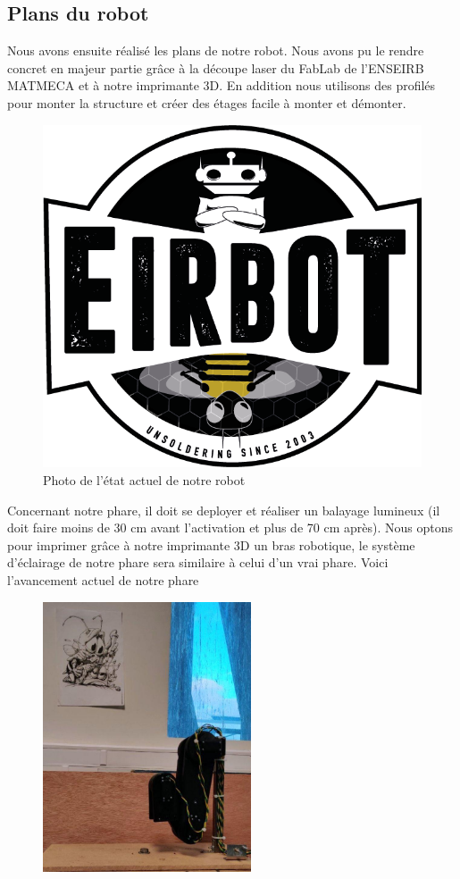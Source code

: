 \documentclass[a4paper,10pt]{article}
\begin{document}
\begin{spacing}{1.5}
\subsection{Plans du robot}
Nous avons ensuite réalisé les plans de notre robot. Nous avons pu le rendre
concret en majeur partie grâce à la découpe laser du FabLab de l'ENSEIRB MATMECA
et à notre imprimante 3D. En addition nous utilisons des profilés pour monter la
structure et créer des étages facile à monter et démonter.
\begin{figure}[H]
  \center
  \includegraphics[scale=0.3]{LogoEirbot.png}
  \caption{Photo de l'état actuel de notre robot}
\end{figure}
Concernant notre phare, il doit se deployer et réaliser un balayage lumineux (il
doit faire moins de 30 cm avant l'activation et plus de 70 cm après). Nous optons
pour imprimer grâce à notre imprimante 3D un bras robotique, le système
d'éclairage de notre phare sera similaire à celui d'un vrai phare. Voici
l'avancement actuel de notre phare
\begin{multicols}{2}
\begin{figure}[H]
  \center
  \includegraphics[scale=0.3, height=8cm]{phare_r.jpg}

\end{figure}
\end{multicols}
\end{spacing}
\end{document}
